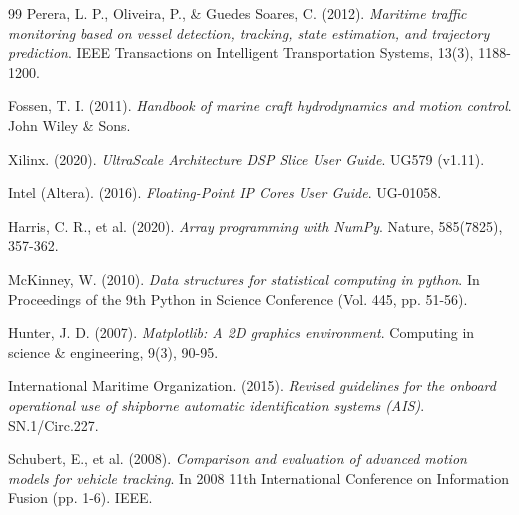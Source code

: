 \begin{thebibliography}{99}
Perera, L. P., Oliveira, P., \& Guedes Soares, C. (2012). \textit{Maritime traffic monitoring based on vessel detection, tracking, state estimation, and trajectory prediction}. IEEE Transactions on Intelligent Transportation Systems, 13(3), 1188-1200.

Fossen, T. I. (2011). \textit{Handbook of marine craft hydrodynamics and motion control}. John Wiley \& Sons.

Xilinx. (2020). \textit{UltraScale Architecture DSP Slice User Guide}. UG579 (v1.11).

Intel (Altera). (2016). \textit{Floating-Point IP Cores User Guide}. UG-01058.

Harris, C. R., et al. (2020). \textit{Array programming with NumPy}. Nature, 585(7825), 357-362.

McKinney, W. (2010). \textit{Data structures for statistical computing in python}. In Proceedings of the 9th Python in Science Conference (Vol. 445, pp. 51-56).

Hunter, J. D. (2007). \textit{Matplotlib: A 2D graphics environment}. Computing in science \& engineering, 9(3), 90-95.

International Maritime Organization. (2015). \textit{Revised guidelines for the onboard operational use of shipborne automatic identification systems (AIS)}. SN.1/Circ.227.

Schubert, E., et al. (2008). \textit{Comparison and evaluation of advanced motion models for vehicle tracking}. In 2008 11th International Conference on Information Fusion (pp. 1-6). IEEE.

\end{thebibliography}
